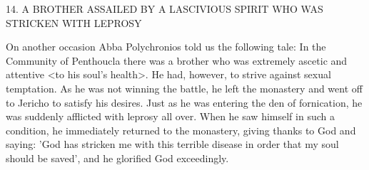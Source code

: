 14. A BROTHER ASSAILED BY A LASCIVIOUS
SPIRIT WHO WAS STRICKEN WITH LEPROSY

On another occasion Abba Polychronios told us the following tale:
In the Community of Penthoucla there was a brother who was
extremely ascetic and attentive <to his soul's health>. He had,
however, to strive against sexual temptation. As he was not winning
the battle, he left the monastery and went off to Jericho to satisfy
his desires. Just as he was entering the den of fornication, he was
suddenly afflicted with leprosy all over. When he saw himself in
such a condition, he immediately returned to the monastery, giving
thanks to God and saying: 'God has stricken me with this terrible
disease in order that my soul should be saved', and he glorified God
exceedingly.

